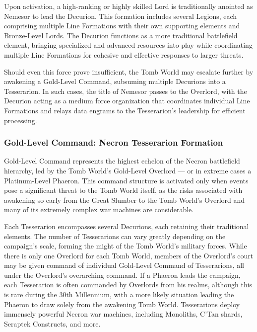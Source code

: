 \begin{multicols}{2}
Upon activation, a high-ranking or highly skilled Lord is traditionally anointed as Nemesor to lead the Decurion. This formation includes several Legions, each comprising multiple Line Formations with their own supporting elements and Bronze-Level Lords. The Decurion functions as a more traditional battlefield element, bringing specialized and advanced resources into play while coordinating multiple Line Formations for cohesive and effective responses to larger threats.

Should even this force prove insufficient, the Tomb World may escalate further by awakening a Gold-Level Command, subsuming multiple Decurions into a Tesserarion. In such cases, the title of Nemesor passes to the Overlord, with the Decurion acting as a medium force organization that coordinates individual Line Formations and relays data engrams to the Tesserarion’s leadership for efficient processing.


\subsubsection{Gold-Level Command: Necron Tesserarion Formation}

Gold-Level Command represents the highest echelon of the Necron battlefield hierarchy, led by the Tomb World's Gold-Level Overlord — or in extreme cases a Platinum-Level Phaeron. This command structure is activated only when events pose a significant threat to the Tomb World itself, as the risks associated with awakening so early from the Great Slumber to the Tomb World's Overlord and many of its extremely complex war machines are considerable.

Each Tesserarion encompasses several Decurions, each retaining their traditional elements. The number of Tesserarions can vary greatly depending on the campaign's scale, forming the might of the Tomb World’s military forces. While there is only one Overlord for each Tomb World, members of the Overlord's court may be given command of individual Gold-Level Command of Tesserarions, all under the Overlord's overarching command. If a Phaeron leads the campaign, each Tesserarion is often commanded by Overlords from his realms, although this is rare during the 30th Millennium, with a more likely situation leading the Phaeron to draw solely from the awakening Tomb World. Tesserarions deploy immensely powerful Necron war machines, including Monoliths, C’Tan shards, Seraptek Constructs, and more.


\end{multicols}
